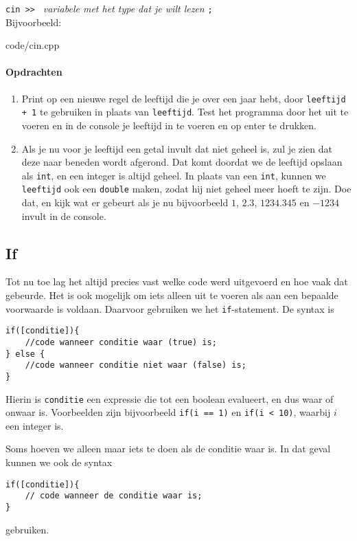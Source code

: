 \documentclass[12pt,a4paper]{article}
\newcommand{\code}{}
\newcommand{\icode}{\lstinline}
\begin{document}
\icode{cin >> } \emph{variabele met het type dat je wilt lezen} \icode{;}\\

Bijvoorbeeld:

\code{code/cin.cpp}
\paragraph{Opdrachten}
\begin{enumerate}
	\item Print op een nieuwe regel de leeftijd die je over een jaar hebt, door \icode{leeftijd + 1} te gebruiken in plaats van \icode{leeftijd}.
		Test het programma door het uit te voeren en in de console je leeftijd in te voeren en op enter te drukken.
	\item
		Als je nu voor je leeftijd een getal invult dat niet geheel is, zul je zien dat deze naar beneden wordt afgerond. Dat komt doordat we de leeftijd opslaan als \icode{int}, en een integer is altijd geheel.
		In plaats van een \icode{int}, kunnen we \icode{leeftijd} ook een \icode{double} maken, zodat hij niet geheel meer hoeft te zijn. Doe dat, en kijk wat er gebeurt als je nu bijvoorbeeld $1$, $2.3$, $1234.345$ en $-1234$ invult in de console.
\end{enumerate}


\subsection{If}
Tot nu toe lag het altijd precies vast welke code werd uitgevoerd en hoe vaak dat gebeurde. Het is ook mogelijk om iets alleen uit te voeren als aan een bepaalde voorwaarde is voldaan. Daarvoor gebruiken we het \icode{if}-statement. De syntax is
\begin{lstlisting}
if([conditie]){
	//code wanneer conditie waar (true) is;
} else {
	//code wanneer conditie niet waar (false) is;
}
\end{lstlisting}
Hierin is \icode{conditie} een expressie die tot een boolean evalueert, en dus waar of onwaar is. Voorbeelden zijn bijvoorbeeld \icode{if(i == 1)} en \icode{if(i < 10)}, waarbij $i$ een integer is. 

Soms hoeven we alleen maar iets te doen als de conditie waar is. In dat geval kunnen we ook de syntax
\begin{lstlisting}
if([conditie]){
	// code wanneer de conditie waar is;
}
\end{lstlisting}
gebruiken.
\end{document}

